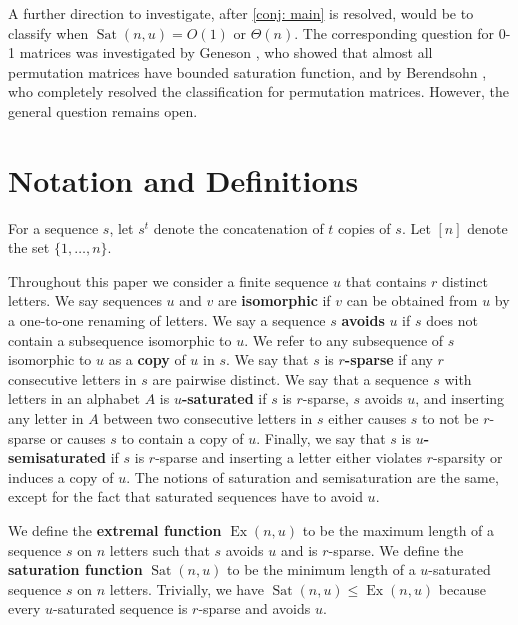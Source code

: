 \documentclass[12pt]{amsart}
\DeclareMathOperator{\Sat}{Sat}
\DeclareMathOperator{\Ex}{Ex}
\theoremstyle{definition}
\numberwithin{equation}{section}
\numberwithin{table}{thm}
\begin{document}
A further direction to investigate, after \cref{conj: main} is resolved, would be to classify when $\Sat(n,u) = O(1)$ or $\Theta(n)$. The corresponding question for 0-1 matrices was investigated by Geneson \cite{Geneson2020AlmostAP}, who showed that almost all permutation matrices have bounded saturation function, and by Berendsohn \cite{Berendsohn2021AnEC}, who completely resolved the classification for permutation matrices. However, the general question remains open. 


\section{Notation and Definitions}\label{sec: defns}
For a sequence $s$, let $s^t$ denote the concatenation of $t$ copies of $s$. Let $[n]$ denote the set $\{1,\dots, n\}$.

Throughout this paper we consider a finite sequence $u$ that contains $r$ distinct letters. We say sequences $u$ and $v$ are \textbf{isomorphic} if $v$ can be obtained from $u$ by a one-to-one renaming of letters. We say a sequence $s$ \textbf{avoids} $u$ if $s$ does not contain a subsequence isomorphic to $u$. We refer to any subsequence of $s$ isomorphic to $u$ as a \textbf{copy} of $u$ in $s$. We say that $s$ is \textbf{$r$-sparse} if any $r$ consecutive letters in $s$ are pairwise distinct. We say that a sequence $s$ with letters in an alphabet $A$ is \textbf{$u$-saturated} if $s$ is $r$-sparse, $s$ avoids $u$, and inserting any letter in $A$ between two consecutive letters in $s$ either causes $s$ to not be $r$-sparse or causes $s$ to contain a copy of $u$. Finally, we say that $s$ is \textbf{$u$-semisaturated} if $s$ is $r$-sparse and inserting a letter either violates $r$-sparsity or induces a copy of $u$. The notions of saturation and semisaturation are the same, except for the fact that saturated sequences have to avoid $u$.

We define the \textbf{extremal function} $\Ex(n,u)$ to be the maximum length of a sequence $s$ on $n$ letters such that $s$ avoids $u$ and is $r$-sparse. We define the \textbf{saturation function} $\Sat(n,u)$ to be the minimum length of a $u$-saturated sequence $s$ on $n$ letters. Trivially, we have $\Sat(n,u)\le \Ex(n,u)$ because every $u$-saturated sequence is $r$-sparse and avoids $u$. 
\end{document}
